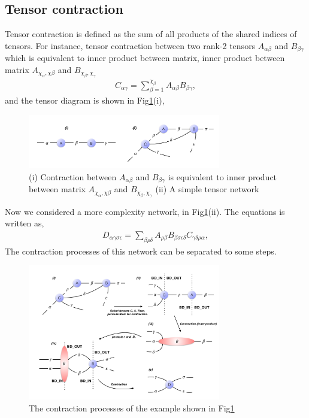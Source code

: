 \subsection{Tensor contraction}
Tensor contraction is defined as the sum of all products of the shared indices of tensors. For instance, tensor contraction between two rank-2 tensors $A_{\alpha \beta}$ and $B_{\beta \gamma}$ which is equivalent to inner product between matrix, inner product between matrix $A_{\chi_{\alpha}, \chi{\beta}}$ and $B_{\chi_{\beta}, \chi_{\gamma}}$
\begin{align}
	C_{\alpha \gamma}=\sum\limits_{\beta = 1}^{\chi_{\beta}}{A_{\alpha \beta}B_{\beta \gamma}},
\end{align}
and the tensor diagram is shown in Fig\ref{fig222}(i),
	\begin{figure}[ht]
	\centering
	\includegraphics[width=0.75\textwidth]{figures/fig222.png}
	\caption[Simple examples of tensor diagrams.]{(i) Contraction between $A_{\alpha \beta}$ and $B_{\beta \gamma}$ is equivalent to inner product between matrix $A_{\chi_{\alpha}, \chi{\beta}}$ and $B_{\chi_{\beta}, \chi_{\gamma}}$ (ii) A simple tensor network}
	\label{fig222}
	\end{figure}

	Now we considered a more complexity network, in Fig\ref{fig222}(ii). The equations is written as, 
\begin{align}
	D_{\alpha \gamma \sigma \epsilon}=\sum_{\beta \rho \delta}{A_{\rho \beta}B_{\beta \sigma \epsilon \delta}C_{\gamma \delta \rho \alpha}},
\end{align}
The contraction processes of this network can be separated to some steps.
	\begin{figure}[ht]
	\centering
	\includegraphics[width=0.75\textwidth]{figures/fig223.png}
	\caption[The contraction processes of the example network which shown in Fig\ref{fig222}(ii)]{ The contraction processes of the example shown in Fig\ref{fig222}}
	\label{fig223}
	\end{figure}

